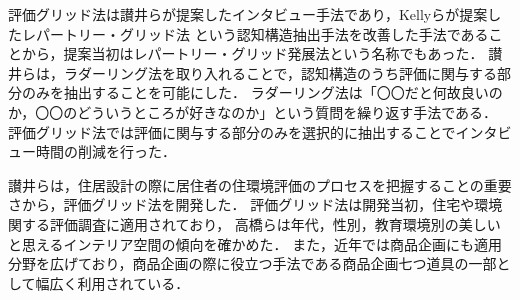 \documentclass[syuuron]{kuee}
\begin{document}
		評価グリッド法は讃井らが提案したインタビュー手法であり，Kellyらが提案したレパートリー・グリッド法\cite{rg1}
		という認知構造抽出手法を改善した手法であることから，提案当初はレパートリー・グリッド発展法という名称でもあった．
		讃井らは，ラダーリング法\cite{rd1}を取り入れることで，認知構造のうち評価に関与する部分のみを抽出することを可能にした．
		ラダーリング法は「〇〇だと何故良いのか，〇〇のどういうところが好きなのか」という質問を繰り返す手法である．
		評価グリッド法では評価に関与する部分のみを選択的に抽出することでインタビュー時間の削減を行った．
		
		讃井らは，住居設計の際に居住者の住環境評価のプロセスを把握することの重要さから，評価グリッド法を開発した．
		評価グリッド法は開発当初，住宅や環境関する評価調査に適用されており，
		高橋らは年代，性別，教育環境別の美しいと思えるインテリア空間の傾向を確かめた\cite{egm1}．
		また，近年では商品企画にも適用分野を広げており，商品企画の際に役立つ手法である商品企画七つ道具の一部として幅広く利用されている\cite{egm2}．
		
\end{document}
